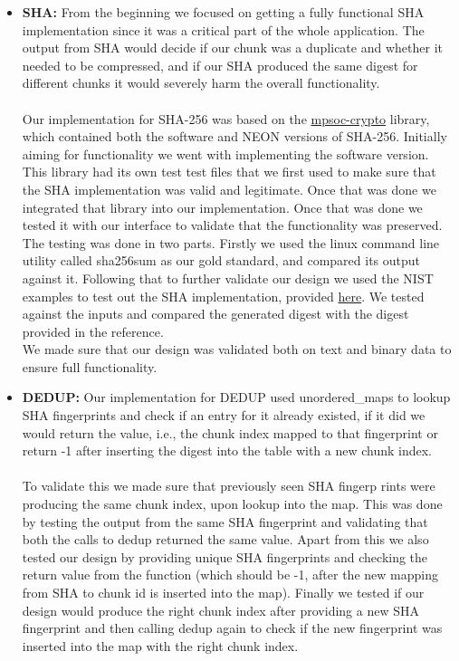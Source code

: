 \documentclass[../main.tex]{subfiles}
\begin{document}
\begin{enumerate}
\begin{itemize}
        \item \textbf{SHA:} From the beginning we focused on getting a fully functional SHA implementation since it was a critical part of the whole application. The output from SHA would decide if our chunk was a duplicate and whether it needed to be compressed, and if our SHA produced the same digest for different chunks it would severely harm the overall functionality. \\ \\
        Our implementation for SHA-256 was based on the \href{https://github.com/james-ben/mpsoc-crypto}{mpsoc-crypto} library, which contained both the software and NEON versions of SHA-256. Initially aiming for functionality we went with implementing the software version. This library had its own test test files that we first used to make sure that the SHA implementation was valid and legitimate. Once that was done we integrated that library into our implementation. Once that was done we tested it with our interface to validate that the functionality was preserved. The testing was done in two parts. Firstly we used the linux command line utility called sha256sum as our gold standard, and compared its output against it. Following that to further validate our design we used the NIST examples to test out the SHA implementation, provided \href{https://csrc.nist.gov/CSRC/media/Projects/Cryptographic-Standards-and-Guidelines/documents/examples/SHA256.pdf}{here}. We tested against the inputs and compared the generated digest with the digest provided in the reference.\\
        We made sure that our design was validated both on text and binary data to ensure full functionality. \\

        \item \textbf{DEDUP:}  Our implementation for DEDUP used unordered\_maps to lookup SHA fingerprints and check if an entry for it already existed, if it did we would return the value, i.e., the chunk index mapped to that fingerprint or return -1 after inserting the digest into the table with a new chunk index. \\ \\
        To validate this we made sure that previously seen SHA fingerp  rints were producing the same chunk index, upon lookup into the map. This was done by testing the output from the same SHA fingerprint and validating that both the calls to dedup returned the same value. Apart from this we also tested our design by providing unique SHA fingerprints and checking the return value from the function (which should be -1, after the new mapping from SHA to chunk id is inserted into the map). Finally we tested if our design would produce the right chunk index after providing a new SHA fingerprint and then calling dedup again to check if the new fingerprint was inserted into the map with the right chunk index. \\


\end{itemize}
\end{enumerate}
\end{document}
